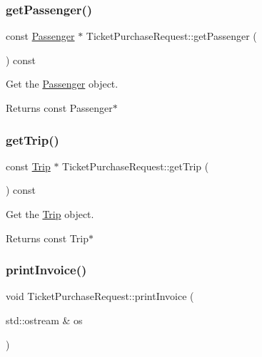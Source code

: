\subsubsection{\texorpdfstring{get\+Passenger()}{getPassenger()}}
{\footnotesize\ttfamily const \mbox{\hyperlink{classPassenger}{Passenger}} $\ast$ Ticket\+Purchase\+Request\+::get\+Passenger (\begin{DoxyParamCaption}{ }\end{DoxyParamCaption}) const}



Get the \mbox{\hyperlink{classPassenger}{Passenger}} object. 

\begin{DoxyReturn}{Returns}
const Passenger$\ast$ 
\end{DoxyReturn}
\mbox{\label{classTicketPurchaseRequest_a7ae48dcccbcddb298fae1bd74048570b}} 
\subsubsection{\texorpdfstring{get\+Trip()}{getTrip()}}
{\footnotesize\ttfamily const \mbox{\hyperlink{classTrip}{Trip}} $\ast$ Ticket\+Purchase\+Request\+::get\+Trip (\begin{DoxyParamCaption}{ }\end{DoxyParamCaption}) const}



Get the \mbox{\hyperlink{classTrip}{Trip}} object. 

\begin{DoxyReturn}{Returns}
const Trip$\ast$ 
\end{DoxyReturn}
\mbox{\label{classTicketPurchaseRequest_a626107dad44c79663d318573e5c6bae2}} 
\subsubsection{\texorpdfstring{print\+Invoice()}{printInvoice()}}
{\footnotesize\ttfamily void Ticket\+Purchase\+Request\+::print\+Invoice (\begin{DoxyParamCaption}\item[{std\+::ostream \&}]{os }\end{DoxyParamCaption})}



